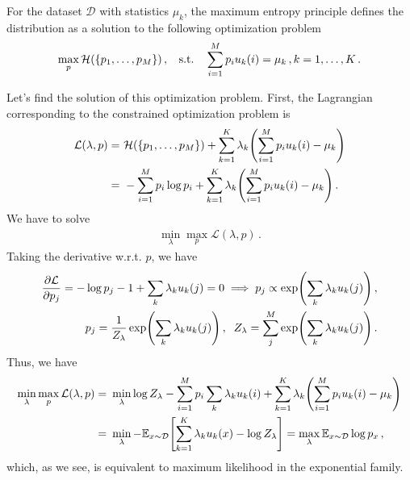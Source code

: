 \begin{mybox}
\begin{definition}\label{def:max_ent}
    For the dataset $\mathcal{D}$ with statistics $\mu_k$, the maximum entropy principle defines the distribution as a solution to the following optimization problem
    \begin{align}
        \max_{p} \mathcal{H}(\{p_1,\ldots,p_M\})\,, \;\; \text{ s.t. }\;\; \sum_{i=1}^M p_i u_k(i) = \mu_k\,, k = 1,\ldots,K\,.
    \end{align}
\end{definition}
\end{mybox}
Let's find the solution of this optimization problem.
First, the Lagrangian corresponding to the constrained optimization problem is
\begin{align}
    \mathcal{L}(\lambda, p) =~& \ent(\{p_1,\ldots,p_M\}) + \sum_{k=1}^K\lambda_k\left(\sum_{i=1}^M p_i u_k(i) - \mu_k\right) \\
    =~& -\sum_{i=1}^M p_i \log p_i + \sum_{k=1}^K\lambda_k\left(\sum_{i=1}^M p_i u_k(i) - \mu_k\right)\,.
\end{align}
We have to solve
\begin{align}
    \min_\lambda \max_p \mathcal{L}(\lambda, p)\,.
\end{align}
Taking the derivative w.r.t. $p$, we have
\begin{align}
    \deriv{\mathcal{L}}{p_j} = -\log p_j - 1 + \sum_k \lambda_k u_k(j) = 0 \implies p_j \propto \exp\left(\sum_k \lambda_k u_k(j)\right)\,,\\
    p_j = \frac{1}{Z_\lambda} \exp\left(\sum_k \lambda_k u_k(j)\right)\,, \;\; Z_\lambda = \sum_{j}^{M} \exp\left(\sum_k \lambda_k u_k(j)\right)\,.
\end{align}
Thus, we have
\begin{align}
    \min_\lambda \max_p \mathcal{L}(\lambda, p) =~& \min_\lambda \log Z_\lambda - \sum_{i=1}^M p_i \sum_k \lambda_k u_k(i) + \sum_{k=1}^K\lambda_k\left(\sum_{i=1}^M p_i u_k(i) - \mu_k\right)\\
    =~& \min_\lambda -\mean_{x\sim \mathcal{D}} \left[\sum_{k=1}^K \lambda_k u_k(x)-\log Z_\lambda\right] = \max_\lambda \mean_{x\sim \mathcal{D}} \log p_x\,,
\end{align}
which, as we see, is equivalent to maximum likelihood in the exponential family.

